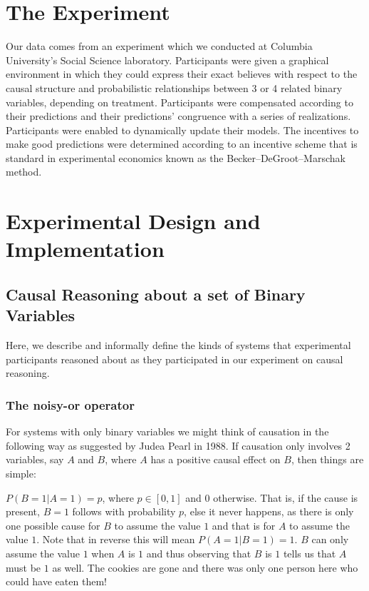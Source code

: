 \section{The Experiment} 

Our data comes from an experiment which we conducted at Columbia University's Social Science laboratory.  Participants were given a graphical environment in which they could express their exact believes with respect to the causal structure and probabilistic relationships between 3 or 4 related binary variables, depending on treatment.  Participants were compensated according to their predictions and their predictions' congruence with a series of realizations.  Participants were enabled to dynamically update their models.   The incentives to make good predictions were determined according to an incentive scheme that is standard in experimental economics known as the Becker–DeGroot–Marschak method.  

\section{Experimental Design and Implementation}

\subsection{Causal Reasoning about a set of Binary Variables}

Here, we describe and informally define the kinds of systems that experimental participants reasoned about as they participated in our experiment on causal reasoning. 

\subsubsection{The noisy-or operator \citep{Pearl88}}

For systems with only binary variables we might think of causation in the following way as suggested by Judea Pearl in 1988.  If causation only involves 2 variables, say $A$ and $B$, where $A$ has a positive causal effect on $B$, then things are simple:

$P(B = 1 | A = 1) = p$, where $p \in [0, 1]$ and 0 otherwise.  That is, if the cause is present, $B=1$ follows with probability $p$, else it never happens, as there is only one possible cause for $B$ to assume the value $1$ and that is for $A$ to assume the value $1$. Note that in reverse this will mean $P(A=1|B=1)=1$. $B$ can only assume the value $1$ when $A$ is $1$ and thus observing that $B$ is $1$ tells us that $A$ must be $1$ as well. The cookies are gone and there was only one person here who could have eaten them! 

